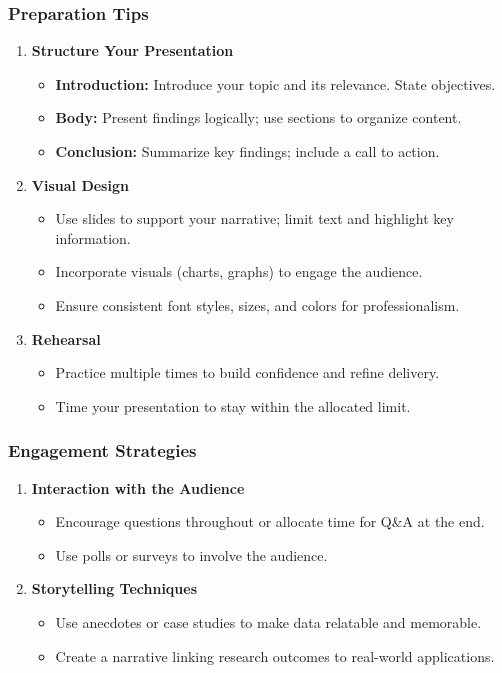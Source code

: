 \documentclass[aspectratio=169]{beamer}
\begin{document}
\begin{frame}[fragile]
    \frametitle{Preparation Tips}
    \begin{enumerate}
        \item \textbf{Structure Your Presentation}
            \begin{itemize}
                \item \textbf{Introduction:} Introduce your topic and its relevance. State objectives.
                \item \textbf{Body:} Present findings logically; use sections to organize content.
                \item \textbf{Conclusion:} Summarize key findings; include a call to action.
            \end{itemize}
        \item \textbf{Visual Design}
            \begin{itemize}
                \item Use slides to support your narrative; limit text and highlight key information.
                \item Incorporate visuals (charts, graphs) to engage the audience.
                \item Ensure consistent font styles, sizes, and colors for professionalism.
            \end{itemize}
        \item \textbf{Rehearsal}
            \begin{itemize}
                \item Practice multiple times to build confidence and refine delivery.
                \item Time your presentation to stay within the allocated limit.
            \end{itemize}
    \end{enumerate}
\end{frame}

\begin{frame}[fragile]
    \frametitle{Engagement Strategies}
    \begin{enumerate}
        \item \textbf{Interaction with the Audience}
            \begin{itemize}
                \item Encourage questions throughout or allocate time for Q\&A at the end.
                \item Use polls or surveys to involve the audience.
            \end{itemize}
        \item \textbf{Storytelling Techniques}
            \begin{itemize}
                \item Use anecdotes or case studies to make data relatable and memorable.
                \item Create a narrative linking research outcomes to real-world applications.
            \end{itemize}
    \end{enumerate}
\end{frame}
\end{document}
